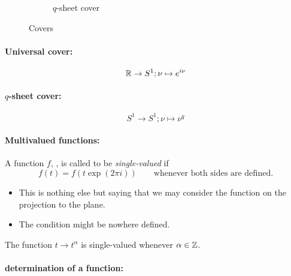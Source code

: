 \begin{figure}[!htbp]
\begin{subfigure}[b]{0.4\textwidth}
    \caption{$q$-sheet cover}
    \label{fig:qCover}
  \end{subfigure}
  \caption{Covers}\label{fig:covers}
\end{figure} %
\paragraph{Universal cover:}
\[
  \mathbb{R}\to S^1; \nu \mapsto e^{i\nu}
\]
\TODO{}

\paragraph{$q$-sheet cover:}
\[
  S^1\to S^1; \nu \mapsto \nu^q
\]
\TODO{}

\paragraph{Multivalued functions:}
\begin{defn}
  A function $f$, , is called to be \emph{single-valued} if
  \[
    f(t)=f(t\exp(2\pi i)) \qquad\text{whenever both sides are defined.}
  \]
  \begin{s-rem}
    \begin{itemize}
      \item This is nothing else but saying that we may consider the function
        on the projection to the plane.
      \item The condition might be nowhere defined.
    \end{itemize}
  \end{s-rem}
  \begin{s-exmp}
    The function $t\to t^\alpha$ is single-valued whenever $\alpha\in\mathbb{Z}$.
  \end{s-exmp}
\end{defn}
\TODO{}

\paragraph{determination of a function:}

